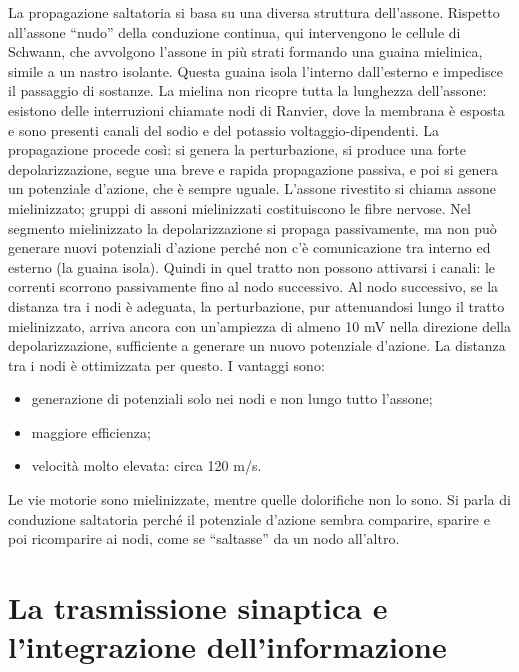 La propagazione saltatoria si basa su una diversa struttura dell’assone. Rispetto all’assone “nudo” della conduzione continua, qui intervengono le cellule di Schwann, che avvolgono l’assone in più strati formando una guaina mielinica, simile a un nastro isolante. Questa guaina isola l’interno dall’esterno e impedisce il passaggio di sostanze.
La mielina non ricopre tutta la lunghezza dell’assone: esistono delle interruzioni chiamate nodi di Ranvier, dove la membrana è esposta e sono presenti canali del sodio e del potassio voltaggio-dipendenti.
La propagazione procede così: si genera la perturbazione, si produce una forte depolarizzazione, segue una breve e rapida propagazione passiva, e poi si genera un potenziale d’azione, che è sempre uguale. L’assone rivestito si chiama assone mielinizzato; gruppi di assoni mielinizzati costituiscono le fibre nervose. Nel segmento mielinizzato la depolarizzazione si propaga passivamente, ma non può generare nuovi potenziali d’azione perché non c’è comunicazione tra interno ed esterno (la guaina isola). Quindi in quel tratto non possono attivarsi i canali: le correnti scorrono passivamente fino al nodo successivo.
Al nodo successivo, se la distanza tra i nodi è adeguata, la perturbazione, pur attenuandosi lungo il tratto mielinizzato, arriva ancora con un’ampiezza di almeno 10 mV nella direzione della depolarizzazione, sufficiente a generare un nuovo potenziale d’azione. La distanza tra i nodi è ottimizzata per questo. I vantaggi sono:
\begin{itemize}
    \item generazione di potenziali solo nei nodi e non lungo tutto l’assone;
    \item maggiore efficienza;
    \item velocità molto elevata: circa 120 m/s.
\end{itemize}
Le vie motorie sono mielinizzate, mentre quelle dolorifiche non lo sono.
Si parla di conduzione saltatoria perché il potenziale d’azione sembra comparire, sparire e poi ricomparire ai nodi, come se “saltasse” da un nodo all’altro.

\section{La trasmissione sinaptica e l’integrazione dell’informazione}

